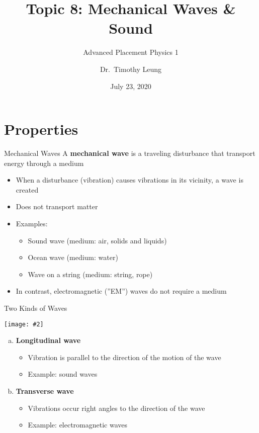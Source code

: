 \documentclass[12pt,aspectratio=169]{beamer}
\title{Topic 8: Mechanical Waves \& Sound}
\subtitle{Advanced Placement Physics 1}
\author[TML]{Dr.\ Timothy Leung}
\institute{Olympiads School\\Toronto, Ontario, Canada}
\date{July 23, 2020}
\newcommand{\pic}[2]{\texttt{[image: \#2]}}
\begin{document}
\begin{frame}
  \titlepage
\end{frame}



\section{Properties}

\begin{frame}{Mechanical Waves}
  A \textbf{mechanical wave} is a traveling disturbance that transport energy
  through a medium
  \begin{itemize}
  \item When a disturbance (vibration) causes vibrations in its vicinity, a
    wave is created
  \item Does not transport matter
  \item Examples:
    \begin{itemize}
    \item Sound wave (medium: air, solids and liquids)
    \item Ocean wave (medium: water)
    \item Wave on a string (medium: string, rope)
    \end{itemize}
  \item In contrast, electromagnetic (''EM'') waves do not require a medium
  \end{itemize}
\end{frame}




\begin{frame}{Two Kinds of Waves}
  \begin{center}
    \pic{.6}{main-qimg.png}
  \end{center}
  \begin{enumerate}[a.]
  \item\textbf{Longitudinal wave}
    \begin{itemize}
    \item Vibration is parallel to the direction of the motion of the wave
    \item Example: sound waves
    \end{itemize}
  \item\textbf{Transverse wave}
    \begin{itemize}
    \item Vibrations occur right angles to the direction of the wave
    \item Example: electromagnetic waves
    \end{itemize}
  \end{enumerate}
\end{frame}
\end{document}
